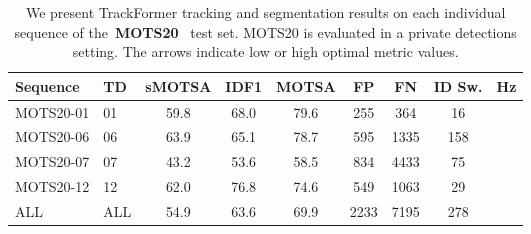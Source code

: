 \documentclass[10pt,twocolumn,letterpaper]{article}
\newcommand{\tablestyle}[2]{\setlength{\tabcolsep}{#1}\renewcommand{\arraystretch}{#2}\centering\footnotesize}
\begin{document}
    \begin{table}
    \tablestyle{1.2pt}{1.05}
    \begin{center}
    \begin{tabular}[t]{lH ccc ccc H}
        \toprule
        Sequence & TD & sMOTSA  & IDF1  & MOTSA  & FP  & FN  & ID Sw.  & Hz  \\

        \midrule
        MOTS20-01 & 01 & 59.8 & 68.0 & 79.6 & 255 & 364 & 16 \\
        MOTS20-06 & 06 & 63.9 & 65.1 & 78.7 & 595 & 1335 & 158 \\
        MOTS20-07 & 07 & 43.2 & 53.6 & 58.5 & 834 & 4433 & 75 \\
        MOTS20-12 & 12 & 62.0 & 76.8 & 74.6 & 549 & 1063 & 29 \\
        \midrule
        ALL & ALL & 54.9 & 63.6 & 69.9 & 2233 & 7195 & 278 \\
        \bottomrule
    \end{tabular}
    \end{center}
\caption{
        We present TrackFormer tracking and segmentation results on each individual sequence of the~\textbf{MOTS20}~\cite{MOTS} test set.
MOTS20 is evaluated in a private detections setting.
The arrows indicate low or high optimal metric values.
    }
\label{tab:mots_eval_trackformer_seqs}
\end{table}     \begin{table*}


    \begin{center}
\end{center}
\end{table*}
\end{document}
